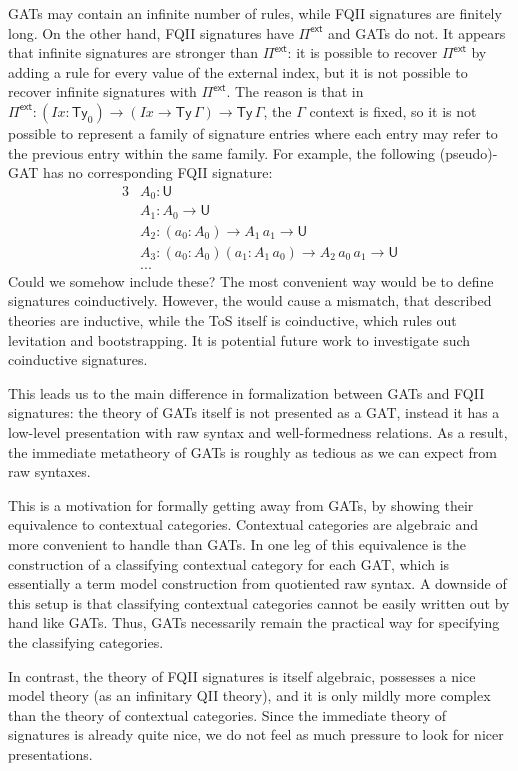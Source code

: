 \documentclass[12pt,a4paper,twoside,openany]{book}
\theoremstyle{remark}
\theoremstyle{definition}
\theoremstyle{theorem}
\newcommand{\mi}[1]{\mathit{#1}}
\newcommand{\Ty}{\mathsf{Ty}}
\newcommand{\U}{\mathsf{U}}
\newcommand{\Pie}{\Pi^{\mathsf{ext}}}
\begin{document}
GATs may contain an infinite number of rules, while FQII signatures are finitely
long. On the other hand, FQII signatures have $\Pie$ and GATs do not. It appears
that infinite signatures are stronger than $\Pie$: it is possible to recover
$\Pie$ by adding a rule for every value of the external index, but it is not
possible to recover infinite signatures with $\Pie$. The reason is that in $\Pie
: (\mi{Ix} : \Ty_0) \to (\mi{Ix} \to \Ty\,\Gamma) \to \Ty\,\Gamma$, the $\Gamma$
context is fixed, so it is not possible to represent a family of signature entries
where each entry may refer to the previous entry within the same family. For example,
the following (pseudo)-GAT has no corresponding FQII signature:
\begin{alignat*}{3}
  &A_0 : \U\\
  &A_1 : A_0 \to \U\\
  &A_2 : (a_0 : A_0) \to A_1\,a_1 \to \U\\
  &A_3 : (a_0 : A_0)(a_1 : A_1\,a_0) \to A_2\,a_0\,a_1 \to \U\\
  &...
\end{alignat*}
Could we somehow include these? The most convenient way would be to define
signatures coinductively. However, the would cause a mismatch, that described
theories are inductive, while the ToS itself is coinductive, which rules out
levitation and bootstrapping. It is potential future work to investigate such
coinductive signatures.

This leads us to the main difference in formalization between GATs and FQII
signatures: the theory of GATs itself is not presented as a GAT, instead it has
a low-level presentation with raw syntax and well-formedness relations. As a
result, the immediate metatheory of GATs is roughly as tedious as we can expect
from raw syntaxes.

This is a motivation for formally getting away from GATs, by showing their
equivalence to contextual categories. Contextual categories are algebraic and
more convenient to handle than GATs. In \cite{cartmellthesis} one leg of this
equivalence is the construction of a classifying contextual category for each
GAT, which is essentially a term model construction from quotiented raw
syntax. A downside of this setup is that classifying contextual categories
cannot be easily written out by hand like GATs. Thus, GATs necessarily remain
the practical way for specifying the classifying categories.

In contrast, the theory of FQII signatures is itself algebraic, possesses a nice
model theory (as an infinitary QII theory), and it is only mildly more complex
than the theory of contextual categories. Since the immediate theory of
signatures is already quite nice, we do not feel as much pressure to look for
nicer presentations.
\end{document}
